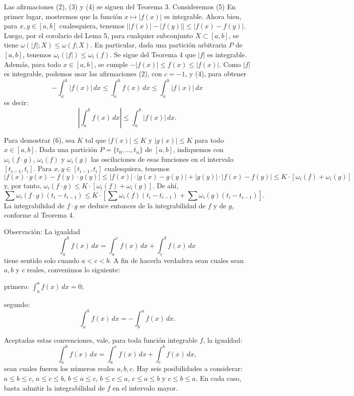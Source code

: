 \documentclass[12pt,oneside]{book}
\begin{document}
Las afirmaciones (2), (3) y (4) se siguen del Teorema 3. Consideremos (5) En primer lugar, mostremos que la función \(x \mapsto |f(x)|\) es integrable. Ahora bien, para \(x, y \in [a, b]\) cualesquiera, tenemos \(\bigl||f(x)| - |f(y)|\bigr| \leq |f(x) - f(y)|\). Luego, por el corolario del Lema 5, para cualquier subconjunto \(X \subset [a, b]\), se tiene \(\omega(|f|; X) \leq \omega(f; X)\). En particular, dada una partición arbitraria \(P\) de \([a, b]\), tenemos \(\omega_i(|f|) \leq \omega_i(f)\). Se sigue del Teorema 4 que \(|f|\) es integrable. Además, para todo \(x \in [a, b]\), se cumple \(-|f(x)| \leq f(x) \leq |f(x)|\). Como \(|f|\) es integrable, podemos usar las afirmaciones (2), con \(c = -1\), y (4), para obtener
\[
-\int_a^b |f(x)| \, dx \leq \int_a^b f(x) \, dx \leq \int_a^b |f(x)| \, dx
\]
es decir:
\[
\left| \int_a^b f(x) \, dx \right| \leq \int_a^b |f(x)| \, dx.
\]

Para demostrar (6), sea \(K\) tal que \(|f(x)| \leq K\) y \(|g(x)| \leq K\) para todo \(x \in [a, b]\). Dada una partición \(P = \{t_0, \ldots, t_n\}\) de \([a, b]\), indiquemos con \(\omega_i(f \cdot g)\), \(\omega_i(f)\) y \(\omega_i(g)\) las oscilaciones de esas funciones en el intervalo \([t_{i-1}, t_i]\). Para \(x, y \in [t_{i-1}, t_i]\) cualesquiera, tenemos
\[
|f(x) \cdot g(x) - f(y) \cdot g(y)| \leq |f(x)| \cdot |g(x) - g(y)| + |g(y)| \cdot |f(x) - f(y)| \leq K \cdot [\omega_i(f) + \omega_i(g)]
\]
y, por tanto, \(\omega_i(f \cdot g) \leq K \cdot [\omega_i(f) + \omega_i(g)]\). De ahí,
\[
\sum \omega_i(f \cdot g)(t_i - t_{i-1}) \leq K \cdot \left[ \sum \omega_i(f)(t_i - t_{i-1}) + \sum \omega_i(g)(t_i - t_{i-1}) \right].
\]
La integrabilidad de \(f \cdot g\) se deduce entonces de la integrabilidad de \(f\) y de \(g\), conforme al Teorema 4.

Observación: La igualdad
\[
\int_a^b f(x) \, dx = \int_a^c f(x) \, dx + \int_c^b f(x) \, dx
\]
tiene sentido solo cuando \(a < c < b\). A fin de hacerla verdadera sean cuales sean \(a, b\) y \(c\) reales, convenimos lo siguiente:

primero: \(\int_a^a f(x) \, dx = 0\);

segundo: \[
\int_a^b f(x) \, dx = - \int_b^a f(x) \, dx.
\]

Aceptadas estas convenciones, vale, para toda función integrable \(f\), la igualdad:
\[
\int_a^b f(x) \, dx = \int_a^c f(x) \, dx + \int_c^b f(x) \, dx,
\]
sean cuales fueren los números reales \(a, b, c\). Hay seis posibilidades a considerar: \(a \leq b \leq c\), \(a \leq c \leq b\), \(b \leq a \leq c\), \(b \leq c \leq a\), \(c \leq a \leq b\) y \(c \leq b \leq a\). En cada caso, basta admitir la integrabilidad de \(f\) en el intervalo mayor.
\end{document}
